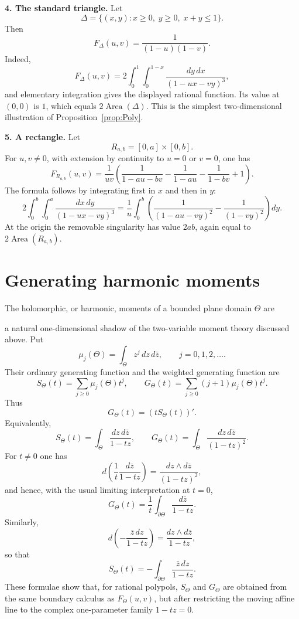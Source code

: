 \documentclass[10pt,a4paper,reqno]{amsart}
\theoremstyle{plain}
\theoremstyle{definition}
\begin{document}
{\bf 4. The standard triangle.}  Let
\[
        \Delta=\{(x,y):x\geq0,\; y\geq0,\; x+y\leq1\}.
\]
Then
\[
        F_\Delta(u,v)=\frac{1}{(1-u)(1-v)} .
\]
Indeed,
\[
        F_\Delta(u,v)=2\int_0^1\int_0^{1-x}
        \frac{dy\,dx}{(1-ux-vy)^3},
\]
and elementary integration gives the displayed rational function.  Its value at
$(0,0)$ is $1$, which equals $2\operatorname{Area}(\Delta)$.
This is the simplest two-dimensional illustration of Proposition~\ref{prop:Poly}.

{\bf 5. A rectangle.}  Let
\[
        R_{a,b}=[0,a]\times[0,b].
\]
For $u,v\ne0$, with extension by continuity to $u=0$ or $v=0$, one has
\[
\boxed{
        F_{R_{a,b}}(u,v)=
        \frac{1}{uv}\left(
        \frac{1}{1-au-bv}-\frac{1}{1-au}
        -\frac{1}{1-bv}+1\right).}
\]
The formula follows by integrating first in $x$ and then in $y$:
\[
2\int_0^b\int_0^a\frac{dx\,dy}{(1-ux-vy)^3}
 =\frac{1}{u}\int_0^b\left(
 \frac{1}{(1-au-vy)^2}-\frac{1}{(1-vy)^2}\right)dy.
\]
At the origin the removable singularity has value $2ab$, again equal to
$2\operatorname{Area}(R_{a,b})$.




\section{Generating harmonic moments} \label{sec:harm}

The holomorphic, or harmonic, moments of a bounded plane domain $\Theta$ are

a natural one-dimensional shadow of the two-variable moment theory discussed
above.  Put
\[
        \mu_j(\Theta)=\int_\Theta z^j\,dz\,d\bar z,\qquad j=0,1,2,\ldots .
\]
Their ordinary generating function and the weighted generating function are
\[
        S_\Theta(t)=\sum_{j\geq 0}\mu_j(\Theta)t^j,
        \qquad
        G_\Theta(t)=\sum_{j\geq 0}(j+1)\mu_j(\Theta)t^j.
\]
Thus
\[
        G_\Theta(t)=(tS_\Theta(t))'.
\]
Equivalently,
\[
        S_\Theta(t)=\int_\Theta\frac{dz\,d\bar z}{1-tz},
        \qquad
        G_\Theta(t)=\int_\Theta\frac{dz\,d\bar z}{(1-tz)^2}.
\]
For $t\ne0$ one has
\[
        d\left(\frac{1}{t}\frac{d\bar z}{1-tz}\right)
        =\frac{dz\wedge d\bar z}{(1-tz)^2},
\]
and hence, with the usual limiting interpretation at $t=0$,
\begin{equation}\label{eq:harmonic-boundary-G}
        G_\Theta(t)=\frac{1}{t}\int_{\partial\Theta}
        \frac{d\bar z}{1-tz}.
\end{equation}
Similarly,
\[
        d\left(-\frac{\bar z\,dz}{1-tz}\right)
        =\frac{dz\wedge d\bar z}{1-tz},
\]
so that
\begin{equation}\label{eq:harmonic-boundary-S}
        S_\Theta(t)=-\int_{\partial\Theta}\frac{\bar z\,dz}{1-tz}.
\end{equation}
These formulae show that, for rational polypols, $S_\Theta$ and $G_\Theta$
are obtained from the same boundary calculus as $F_\Theta(u,v)$, but after
restricting the moving affine line to the complex one-parameter family
$1-tz=0$.
\end{document}

